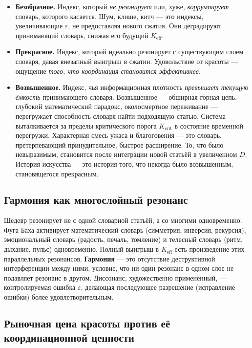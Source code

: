 \documentclass[12pt,a4paper]{article}
\begin{document}
	\begin{itemize}[leftmargin=*]
		\item \textbf{Безобразное.} Индекс, который \emph{не резонирует} или, хуже, \emph{коррумпирует} словарь, которого касается. Шум, клише, китч — это индексы, увеличивающие \(\varepsilon\), не предоставляя нового сжатия. Они деградируют принимающий словарь, снижая его будущий \(K_{\mathrm{eff}}\).
		\item \textbf{Прекрасное.} Индекс, который идеально резонирует с существующим слоем словаря, давая внезапный выигрыш в сжатии. Удовольствие от красоты — ощущение \emph{того, что координация становится эффективнее}.
		\item \textbf{Возвышенное.} Индекс, чья информационная плотность \emph{превышает текущую ёмкость} принимающего словаря. Возвышенное — обширная горная цепь, глубокий математический парадокс, околосмертное переживание — перегружает способность словаря найти подходящую статью. Система выталкивается за пределы критического порога \(K_{\mathrm{crit}}\) в состояние временной перегрузки. Характерная смесь ужаса и благоговения — это словарь, претерпевающий принудительное, быстрое расширение. То, что было невыразимым, становится после интеграции новой статьёй в увеличенном \(D\). История искусства — это история того, что некогда было возвышенным, становящегося прекрасным.
	\end{itemize}
	
	\subsection{Гармония как многослойный резонанс}
	
	Шедевр резонирует не с одной словарной статьёй, а со многими одновременно. Фуга Баха активирует математический словарь (симметрия, инверсия, рекурсия), эмоциональный словарь (радость, печаль, томление) и телесный словарь (ритм, дыхание, пульс) одновременно. Полный выигрыш в \(K_{\mathrm{eff}}\) есть произведение этих параллельных резонансов. \textbf{Гармония} — это отсутствие деструктивной интерференции между ними, условие, что ни один резонанс в одном слое не подавляет резонанс в другом. Диссонанс, художественно применённый, — контролируемая ошибка \(\varepsilon\), делающая последующее разрешение (исправление ошибки) более удовлетворительным.
	
	\subsection{Рыночная цена красоты против её координационной ценности}
	
\end{document}
